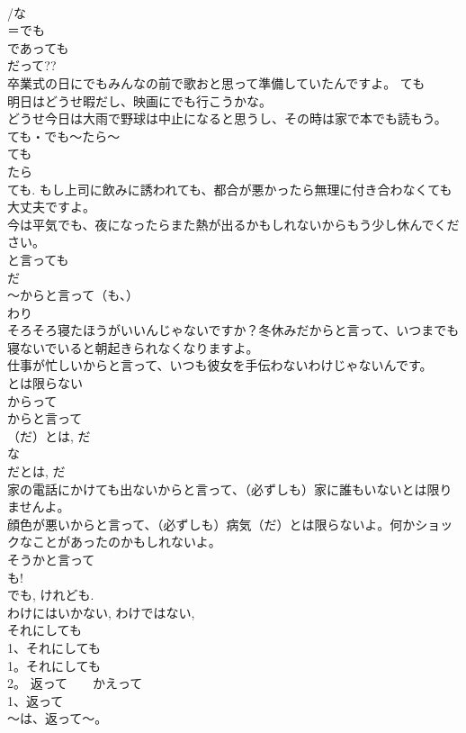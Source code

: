 \documentclass[8pt]{extreport}
\begin{document}
\begin{CJK}{UTF8}{min}
\\	/な
\\	＝でも 
\\	であっても 
\\	だって?? 
\\	卒業式の日にでもみんなの前で歌おと思って準備していたんですよ。 ても 
\\	明日はどうせ暇だし、映画にでも行こうかな。 
\\	どうせ今日は大雨で野球は中止になると思うし、その時は家で本でも読もう。 
\\	ても・でも～たら～ 
\\	ても 
\\	たら 
\\	ても. もし上司に飲みに誘われても、都合が悪かったら無理に付き合わなくても大丈夫ですよ。 
\\	今は平気でも、夜になったらまた熱が出るかもしれないからもう少し休んでください。 
\\	と言っても
\\	だ 
\\	～からと言って（も、） 
\\	わり 
\\	そろそろ寝たほうがいいんじゃないですか？冬休みだからと言って、いつまでも寝ないでいると朝起きられなくなりますよ。 
\\	仕事が忙しいからと言って、いつも彼女を手伝わないわけじゃないんです。 
\\	とは限らない 
\\	からって 
\\	からと言って 
\\	（だ）とは, だ 
\\	な
\\	だとは, だ 
\\	家の電話にかけても出ないからと言って、（必ずしも）家に誰もいないとは限りませんよ。 
\\	顔色が悪いからと言って、（必ずしも）病気（だ）とは限らないよ。何かショックなことがあったのかもしれないよ。 
\\	そうかと言って 
\\	も! 
\\	でも, けれども. 
\\	わけにはいかない, わけではない, 
\\	それにしても 
\\	1、それにしても
\\	1。それにしても
\\	2。 返って　　かえって 
\\	1、返って
\\	～は、返って～。 

\end{CJK}
\end{document}

